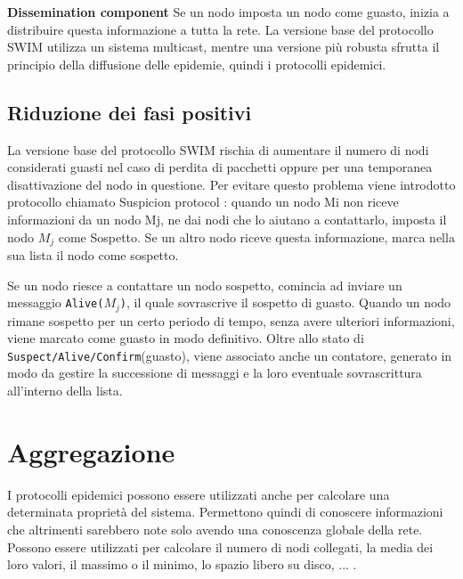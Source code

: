 \textbf{Dissemination component} Se un nodo imposta un nodo come guasto, inizia a distribuire questa informazione a tutta la rete. La versione base del protocollo SWIM utilizza un sistema multicast, mentre una versione più robusta sfrutta il principio della diffusione delle epidemie, quindi i protocolli epidemici.
\subsection{Riduzione dei fasi positivi}
La versione base del protocollo SWIM rischia di aumentare il numero di nodi considerati guasti nel caso di perdita di pacchetti oppure per una temporanea disattivazione del nodo in questione. Per evitare questo problema viene introdotto protocollo  chiamato Suspicion protocol \cite{swim}: quando un nodo Mi non riceve informazioni da un nodo Mj, ne dai nodi che lo aiutano a contattarlo, imposta il nodo $M_j$ come Sospetto. Se un altro nodo riceve questa informazione, marca nella sua lista il nodo come sospetto.

Se un nodo riesce a contattare un nodo sospetto, comincia ad inviare un messaggio \texttt{Alive($M_j$)}, il quale sovrascrive il sospetto di guasto. Quando un nodo rimane sospetto per un certo periodo di tempo, senza avere ulteriori informazioni, viene marcato come guasto in modo definitivo. Oltre allo stato di \texttt{Suspect/Alive/Confirm}(guasto), viene associato anche un contatore, generato in modo da gestire la successione di messaggi e la loro eventuale sovrascrittura all’interno della lista.

\section{Aggregazione}
I protocolli epidemici possono essere utilizzati anche per calcolare una determinata proprietà del sistema. Permettono quindi di conoscere informazioni che altrimenti sarebbero note solo avendo una conoscenza globale della rete. Possono essere utilizzati per calcolare il numero di nodi collegati, la media dei loro valori, il massimo o il minimo, lo spazio libero su disco, ... \cite{montresor}.

